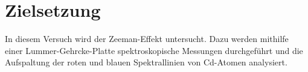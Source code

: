 \section{Zielsetzung}
\label{sec:zielsetzung}
In diesem Versuch wird der Zeeman-Effekt untersucht. Dazu werden mithilfe einer Lummer-Gehrcke-Platte spektroskopische Messungen durchgeführt und die Aufspaltung der roten und blauen Spektrallinien von
Cd-Atomen analysiert.

